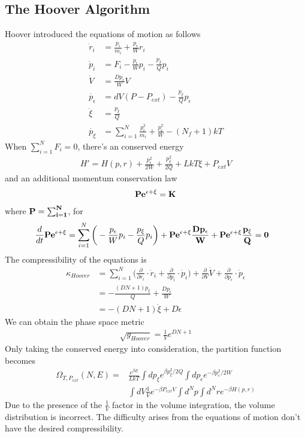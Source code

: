 \documentclass{article}
\begin{document}
\subsection{The Hoover Algorithm}
Hoover introduced the equations of motion as follows
\begin{align}
\dot{r}_i&=\frac{p_i}{m_i}+\frac{p_{\epsilon}}{W}r_i\nonumber\\ 
\dot{p}_i&=F_i-\frac{p_{\epsilon}}{W}p_i-\frac{p_{\xi}}{Q}p_i\nonumber\\
\dot{V}&=\frac{Dp_{\epsilon}}{W}V\nonumber\\
\dot{p_{\epsilon}}&=dV(P-P_{ext})-\frac{p_{\xi}}{Q}p_{\epsilon}\\
\dot{\xi}&=\frac{p_{\xi}}{Q}\nonumber\\
\dot{p_{\xi}}&=\sum^N_{i=1}\frac{p_i^2}{m_i}+\frac{p_{\epsilon}^2}{W}-(N_f+1)kT\nonumber
\end{align}
When $\sum_{i=1}^NF_i=0$, there's an conserved energy
\begin{align}
H'=H(p,r)+\frac{p_{\epsilon}^2}{2W}+\frac{p_{\xi}^2}{2Q}+LkT\xi+P_{ext}V
\end{align}
and an additional momentum conservation law
\begin{align}
\bf{P}e^{\epsilon+\xi}=K
\end{align}
where $\bf{P}=\sum_{i=1}^N$, for
\begin{align}
\frac{d}{dt}\bf{P}e^{\epsilon+\xi}&=\sum_{i=1}^N\bigg(-\frac{p_{\epsilon}}{W}p_i-\frac{p_{\xi}}{Q}p_i\bigg)+\bf{P}e^{\epsilon+\xi}\frac{Dp_{\epsilon}}{W}+\bf{P}e^{\epsilon+\xi}\frac{p_{\xi}}{Q}=0
\end{align}
The compressibility of the equations is
\begin{align}
\kappa_{Hoover}&=\sum_{i=1}^N\bigg(\frac{\partial}{\partial r_i}\cdot\dot{r}_i+\frac{\partial}{\partial p_i}\cdot\dot{p}_i\bigg)+\frac{\partial}{\partial V}\dot{V}+\frac{\partial}{\partial p_{\epsilon}}\cdot\dot{p}_{\epsilon}\nonumber\\
&=-\frac{(DN+1)p_{\xi}}{Q}+\frac{Dp_{\epsilon}}{W}\\
&=-(DN+1)\dot{\xi}+D\dot{\epsilon}\nonumber
\end{align}
We can obtain the phase space metric 
\begin{align}
\sqrt{g_{Hoover}}=\frac{1}{V}e^{DN+1}
\end{align}
Only taking the conserved energy into consideration, the partition function becomes
\begin{align}
\Omega_{T,P_{ext}}(N,E)=&\frac{e^{\beta E}}{LkT}\int dp_{\xi}e^{\beta p_{\xi}^2/2Q}\int dp_{\epsilon}e^{-\beta p_{\epsilon}^2/2W}\nonumber\\
&\int dV\frac{1}{V}e^{-\beta P_{ext}V}\int d^Np\int d^Nre^{-\beta H(p,r)}
\end{align}
Due to the presence of the $\frac{1}{V}$ factor in the volume integration, the volume distribution is incorrect. The difficulty arises from the equations of motion don't have the desired compressibility.
\end{document}
